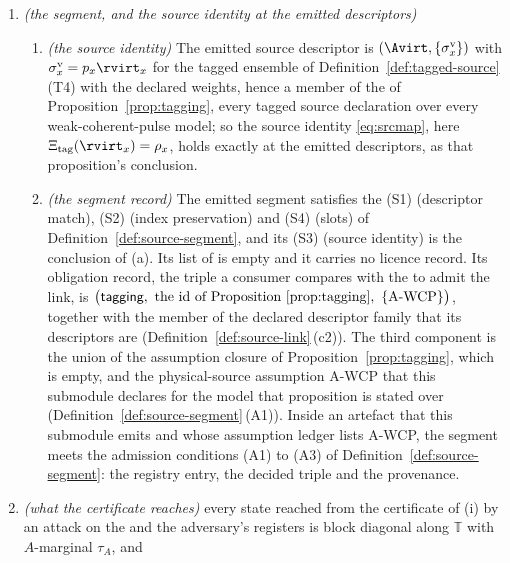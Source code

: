 \begin{corollary}
\begin{enumerate}[label=(\roman*),leftmargin=3.0em]
in the sense of Definition~\ref{def:source-spec} in
; and
Theorem~\ref{thm:certificate-sufficiency} holds of it, its part (i) reading (E1) to (E3) as the
decided conditions.
\item \emph{(the segment, and the source identity at the emitted descriptors)}
\begin{enumerate}[label=(\alph*),leftmargin=2.2em]
\item \emph{(the source identity)} The emitted source descriptor is
$(\Avirt,\{\sigma^{\mathrm v}_x\})$ with $\sigma^{\mathrm v}_x=p_x\rvirt_x$ for
the tagged ensemble of Definition~\ref{def:tagged-source}\,(T4) with the
declared weights, hence a member of the  of
Proposition~\ref{prop:tagging}, every tagged source declaration over every
weak-coherent-pulse model; so the source identity \eqref{eq:srcmap}, here
$\Xi_{\mathrm{tag}}(\rvirt_x)=\rho_x$, holds exactly at the emitted
descriptors, as that proposition's conclusion.
\item \emph{(the segment record)} The emitted segment satisfies the
 (S1) (descriptor match), (S2) (index preservation)
and (S4) (slots) of Definition~\ref{def:source-segment}, and its (S3) (source
identity) is the conclusion of (a). Its list of
 is empty and it carries no licence
record. Its obligation record, the triple a consumer compares with the
 to admit the link, is
$\big(\textsf{tagging},\ \text{the id of Proposition~\ref{prop:tagging}},\
\{\mathrm{A\textnormal{-}WCP}\}\big)$, together with the member of the declared
descriptor family that its descriptors are
(Definition~\ref{def:source-link}\,(c2)). The third component is the union of
the assumption closure of Proposition~\ref{prop:tagging}, which is empty, and
the physical-source assumption A-WCP that this submodule declares for the model
that proposition is stated over (Definition~\ref{def:source-segment}\,(A1)).
Inside an artefact that this submodule emits and whose assumption ledger lists
A-WCP, the segment meets the admission conditions (A1) to (A3) of
Definition~\ref{def:source-segment}: the registry entry, the decided triple
and the provenance.
\end{enumerate}
\item \emph{(what the certificate reaches)} every state reached from the
certificate of (i) by an attack on the
 and the adversary's
registers is block diagonal along $\mathbb{T}$ with $A$-marginal $\tau_A$, and

\end{enumerate}
\end{corollary}
